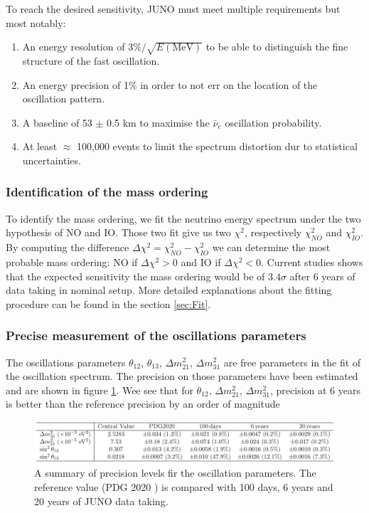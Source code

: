 To reach the desired sensitivity, JUNO must meet multiple requirements but most notably:
\begin{enumerate}
  \item An energy resolution of $3\%/\sqrt{E\mathrm{(MeV)}}$ to be able to distinguish the fine structure of the fast oscillation.
  \item An energy precision of 1\% in order to not err on the location of the oscillation pattern.
  \item A baseline of 53 $\pm$ 0.5 km to maximise the $\bar{\nu}_e$ oscillation probability.
  \item At least $\approx$ 100,000 events to limit the spectrum distortion dur to statistical uncertainties.
\end{enumerate}

\subsubsection{Identification of the mass ordering}

To identify the mass ordering, we fit the neutrino energy spectrum under the two hypothesis of NO and IO. Those two fit give us two $\chi^2$, respectively $\chi^2_{NO}$ and $\chi^2_{IO}$. By computing the difference $\Delta \chi ^2 = \chi^2_{NO} - \chi^2_{IO}$ we can determine the most probable mass ordering: NO if $\Delta \chi^2 > 0$ and IO if $\Delta \chi^2 < 0$. Current studies shows that the expected sensitivity the mass ordering would be of $3.4 \sigma$ after 6 years of data taking in nominal setup\cite{an_neutrino_2016}. More detailed explanations about the fitting procedure can be found in the section \ref{sec:Fit}.

\subsubsection{Precise measurement of the oscillations parameters}

The oscillations parameters $\theta_{12}$, $\theta_{13}$, $\Delta m^2_{21}$, $\Delta m^2_{31}$ are free parameters in the fit of the oscillation spectrum. The precision on those parameters have been estimated and are shown in figure \ref{fig:juno-param-precision}. Wee see that for $\theta_{12}$, $\Delta m^2_{21}$, $\Delta m^2_{31}$, precision at 6 years is better than the reference precision by an order of magnitude \cite{juno_collaboration_sub-percent_2022}

\begin{figure}[hb]
  \centering
  \includegraphics[width=\linewidth]{images/juno/oscillation_params_precision.png}
  \caption{A summary of precision levels fir the oscillation parameters. The reference value (PDG 2020 \cite{particle_data_group_review_2020}) is compared with 100 days, 6 years and 20 years of JUNO data taking.}
  \label{fig:juno-param-precision}
\end{figure}

